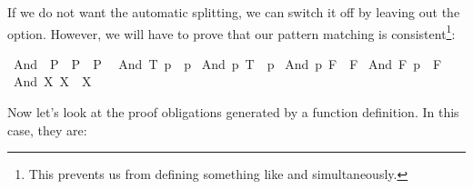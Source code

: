\begin{isabellebody}
\begin{isamarkuptext}
  If we do not want the automatic splitting, we can switch it off by
  leaving out the  option. However, we will have to
  prove that our pattern matching is consistent\footnote{This prevents
  us from defining something like  and  simultaneously.}:%
\end{isamarkuptext}%
\isamarkuptrue%
\isamarkupfalse%
\ And{}\ {}{}\ {}P{}\ {}\ P{}\ {}\ P{}{}\isanewline
{}\isanewline
\ \ {}And{}\ T\ p\ {}\ p{}\isanewline
{}\ {}And{}\ p\ T\ {}\ p{}\isanewline
{}\ {}And{}\ p\ F\ {}\ F{}\isanewline
{}\ {}And{}\ F\ p\ {}\ F{}\isanewline
{}\ {}And{}\ X\ X\ {}\ X{}%
\isadelimproof
%
\endisadelimproof
%
\isatagproof
%
\begin{isamarkuptxt}%
\noindent Now let's look at the proof obligations generated by a
  function definition. In this case, they are:


\end{isamarkuptxt}
\end{isabellebody}
